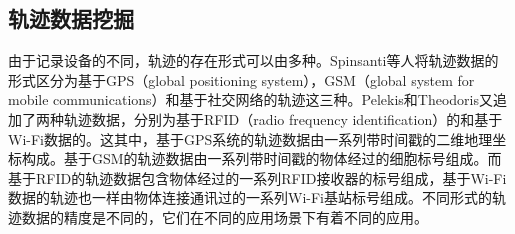\subsection{轨迹数据挖掘}




由于记录设备的不同，轨迹的存在形式可以由多种。Spinsanti等人将轨迹数据的形式区分为基于GPS（global positioning system），GSM（global system for mobile communications）和基于社交网络的轨迹这三种。Pelekis和Theodoris又追加了两种轨迹数据，分别为基于RFID（radio frequency identification）的和基于Wi-Fi数据的。这其中，基于GPS系统的轨迹数据由一系列带时间戳的二维地理坐标构成。基于GSM的轨迹数据由一系列带时间戳的物体经过的细胞标号组成。而基于RFID的轨迹数据包含物体经过的一系列RFID接收器的标号组成，基于Wi-Fi数据的轨迹也一样由物体连接通讯过的一系列Wi-Fi基站标号组成。不同形式的轨迹数据的精度是不同的，它们在不同的应用场景下有着不同的应用。

